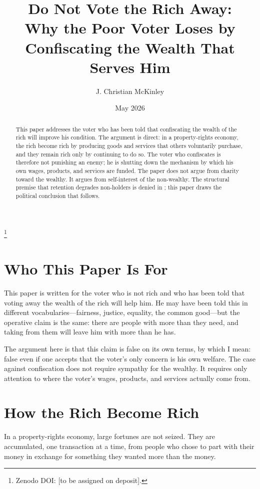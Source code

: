 \documentclass[11pt]{article}
\title{Do Not Vote the Rich Away:\\
Why the Poor Voter Loses by Confiscating the Wealth That Serves Him}
\author{J. Christian McKinley}
\date{May 2026}
\newcommand\blfootnote[1]{%
  \begingroup
  \renewcommand\thefootnote{}\footnote{#1}%
  \addtocounter{footnote}{-1}%
  \endgroup
}
\begin{document}
\maketitle
\blfootnote{Zenodo DOI: [to be assigned on deposit].}

\begin{abstract}
This paper addresses the voter who has been told that confiscating the wealth of the rich will improve his condition. The argument is direct: in a property-rights economy, the rich become rich by producing goods and services that others voluntarily purchase, and they remain rich only by continuing to do so. The voter who confiscates is therefore not punishing an enemy; he is shutting down the mechanism by which his own wages, products, and services are funded. The paper does not argue from charity toward the wealthy. It argues from self-interest of the non-wealthy. The structural premise that retention degrades non-holders is denied in \cite{nogo}; this paper draws the political conclusion that follows.
\end{abstract}

\section{Who This Paper Is For}

This paper is written for the voter who is not rich and who has been told that voting away the wealth of the rich will help him. He may have been told this in different vocabularies---fairness, justice, equality, the common good---but the operative claim is the same: there are people with more than they need, and taking from them will leave him with more than he has.

The argument here is that this claim is false on its own terms, by which I mean: false even if one accepts that the voter's only concern is his own welfare. The case against confiscation does not require sympathy for the wealthy. It requires only attention to where the voter's wages, products, and services actually come from.

\section{How the Rich Become Rich}

In a property-rights economy, large fortunes are not seized. They are accumulated, one transaction at a time, from people who chose to part with their money in exchange for something they wanted more than the money.
\end{document}
